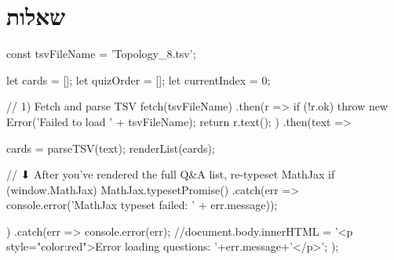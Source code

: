 \documentclass{tstextbook}
\begin{document}
\section{שאלות}


    const tsvFileName = 'Topology_8.tsv';

    let cards = [];
    let quizOrder = [];
    let currentIndex = 0;

    // 1) Fetch and parse TSV
fetch(tsvFileName)
  .then(r => {
    if (!r.ok) throw new Error('Failed to load ' + tsvFileName);
    return r.text();
  })
  .then(text => {
    cards = parseTSV(text);
    renderList(cards);

    // ⬇ After you’ve rendered the full Q&A list, re-typeset MathJax
    if (window.MathJax) {
      MathJax.typesetPromise()
        .catch(err => console.error('MathJax typeset failed: ' + err.message));
    }
  })
  .catch(err => {
    console.error(err);
    //document.body.innerHTML =  '<p style="color:red">Error loading questions: '+err.message+'</p>';
  });
\end{document}
